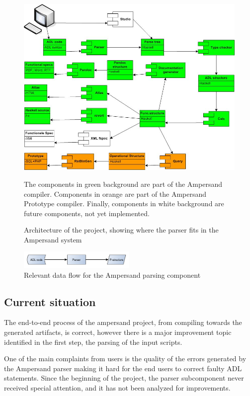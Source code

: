 %
\begin{figure}[htb]
	\centering
	\includegraphics[width=\textwidth]{Figures/ADL_systeemarchitectuur}
	\caption[Architecture of the project]{Architecture of the project, showing where the parser fits in the Ampersand system}
	\label{fig:architecture}
	\small
	The components in green background are part of the Ampersand compiler.
	Components in orange are part of the Ampersand Prototype compiler.
	Finally, components in white background are future components, not yet implemented.
\end{figure}
%
\begin{figure}[htb]
	\centering
	\includegraphics[width=0.5\textwidth]{Figures/Architecture}
	\caption{Relevant data flow for the Ampersand parsing component}
	\label{fig:data-flow}
\end{figure}

\subsection{Current situation}
The end-to-end process of the ampersand project, from compiling towards the generated artifacts, is correct, however there is a major improvement topic identified in the first step, the parsing of the input scripts.

One of the main complaints from users is the quality of the errors generated by the Ampersand parser making it hard for the end users to correct faulty ADL statements.
Since the beginning of the project, the parser subcomponent never received special attention, and it has not been analyzed for improvements.

